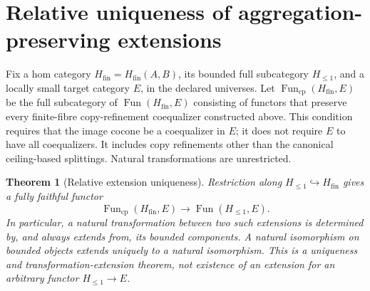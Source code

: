\documentclass[11pt]{article}
\newtheorem{theorem}{Theorem}
\newcommand{\Ha}{H_{\leq 1}}
\newcommand{\HM}{H_{\mathrm{fin}}}
\newcommand{\Hh}{\HM}
\newcommand{\Bb}{\Ha}
\begin{document}
\section{Relative uniqueness of aggregation-preserving extensions}
Fix a hom category $\Hh=\Hh(A,B)$, its bounded full subcategory $\Bb$,
and a locally small target category $E$, in the declared universes.
Let $\operatorname{Fun}_{\mathrm{cp}}(\Hh,E)$ be the full subcategory of
$\operatorname{Fun}(\Hh,E)$ consisting of functors that preserve every
finite-fibre copy-refinement coequalizer constructed above. This condition
requires that the image cocone be a coequalizer in $E$; it does not require
$E$ to have all coequalizers. It includes copy refinements other than the
canonical ceiling-based splittings. Natural transformations are unrestricted.

\begin{theorem}[Relative extension uniqueness]
Restriction along $\Bb\hookrightarrow\Hh$ gives a fully faithful functor
\[
 \operatorname{Fun}_{\mathrm{cp}}(\Hh,E)
 \longrightarrow \operatorname{Fun}(\Bb,E).
\]
In particular, a natural transformation between two such extensions is
determined by, and always extends from, its bounded components. A natural
isomorphism on bounded objects extends uniquely to a natural isomorphism.
This is a uniqueness and transformation-extension theorem, not existence
of an extension for an arbitrary functor $\Bb\to E$.
\end{theorem}
\end{document}
